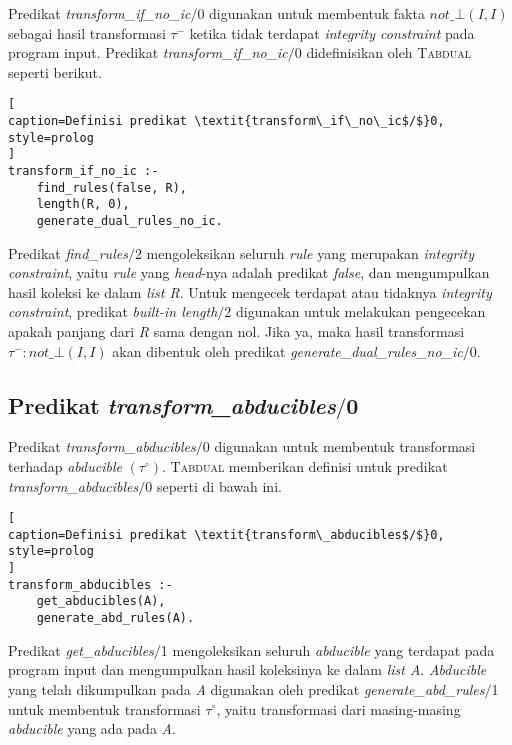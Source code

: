 Predikat \textit{transform\_if\_no\_ic$/$}0 digunakan untuk membentuk fakta $not\_\bot(I,I)$ sebagai hasil transformasi $\tau^-$ ketika tidak terdapat \textit{integrity constraint} pada program input. Predikat \textit{transform\_if\_no\_ic$/$}0 didefinisikan oleh \textsc{Tabdual} seperti berikut.
\\

\begin{lstlisting}[
caption=Definisi predikat \textit{transform\_if\_no\_ic$/$}0,
style=prolog
]
transform_if_no_ic :-
	find_rules(false, R),
	length(R, 0),
	generate_dual_rules_no_ic.
\end{lstlisting}

Predikat \textit{find\_rules$/$}2 mengoleksikan seluruh \textit{rule} yang merupakan \textit{integrity constraint}, yaitu \textit{rule} yang \textit{head}-nya adalah predikat \textit{false}, dan mengumpulkan hasil koleksi ke dalam \textit{list R}. Untuk mengecek terdapat atau tidaknya \textit{integrity constraint}, predikat \textit{built-in length$/$}2 digunakan untuk melakukan pengecekan apakah panjang dari \textit{R} sama dengan nol. Jika ya, maka hasil transformasi $\tau^- : not\_\bot(I,I)$ akan dibentuk oleh predikat \textit{generate\_dual\_rules\_no\_ic$/$}0.

\subsection{Predikat \textit{transform\_abducibles$/$}0}

Predikat \textit{transform\_abducibles$/$}0 digunakan untuk membentuk transformasi terhadap \textit{abducible} $(\tau^\circ)$. \textsc{Tabdual} memberikan definisi untuk predikat \textit{transform\_abducibles$/$}0 seperti di bawah ini.
\\

\begin{lstlisting}[
caption=Definisi predikat \textit{transform\_abducibles$/$}0,
style=prolog
]
transform_abducibles :-
	get_abducibles(A),
	generate_abd_rules(A).
\end{lstlisting}

Predikat \textit{get\_abducibles$/$}1 mengoleksikan seluruh \textit{abducible} yang terdapat pada program input dan mengumpulkan hasil koleksinya ke dalam \textit{list A}. \textit{Abducible} yang telah dikumpulkan pada \textit{A} digunakan oleh predikat \textit{generate\_abd\_rules$/$}1 untuk membentuk transformasi $\tau^\circ$, yaitu transformasi dari masing-masing \textit{abducible} yang ada pada \textit{A}.

